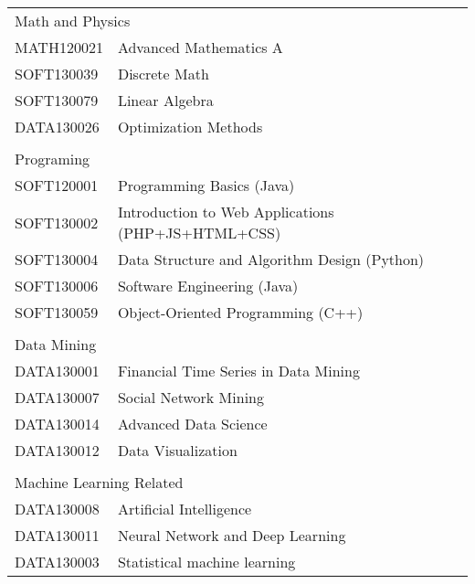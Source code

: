 \begin{table}[]
\begin{tabular}{lll}
\multicolumn{2}{l}{Math and Physics}                              &  \\
MATH120021   & Advanced Mathematics A                             &  \\
SOFT130039   & Discrete Math                                      &  \\
SOFT130079   & Linear Algebra                                     &  \\
DATA130026   & Optimization Methods                               &  \\
             &                                                    &  \\
\multicolumn{2}{l}{Programing}                                    &  \\
SOFT120001   & Programming Basics (Java)                          &  \\
SOFT130002   & Introduction to Web Applications (PHP+JS+HTML+CSS) &  \\
SOFT130004   & Data Structure and Algorithm Design (Python)       &  \\
SOFT130006   & Software Engineering (Java)                        &  \\
SOFT130059   & Object-Oriented Programming (C++)                  &  \\
             &                                                    &  \\
\multicolumn{2}{l}{Data Mining}                                   &  \\
DATA130001   & Financial Time Series in Data Mining               &  \\
DATA130007   & Social Network Mining                              &  \\
DATA130014   & Advanced Data Science                              &  \\
DATA130012   & Data Visualization                                 &  \\
             &                                                    &  \\
\multicolumn{2}{l}{Machine Learning Related}                      &  \\
DATA130008   & Artificial Intelligence                            &  \\
DATA130011   & Neural Network and Deep Learning                   &  \\
DATA130003   & Statistical machine learning                       &  \\

\end{tabular}
\end{table}
